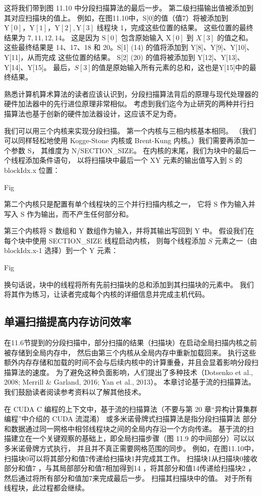 这将我们带到图 11.10 中分段扫描算法的最后一步。 第二级扫描输出值被添加到其对应扫描块的值上。 
例如，在图11.10中，S[0]的值（值7）将被添加到$\mathrm{Y}[0]，\mathrm{Y}[1]，\mathrm{Y}[2], \mathrm{Y}[3]$ 线程块 1，完成这些位置的结果。 这些位置的最终结果为 $7,11,12,14$。 
这是因为 $\mathrm{S}[0]$ 包含原始输入 $\mathrm{X}[0]$ 到 $X[3]$ 的值之和。 
这些最终结果是 14、17、18 和 20。S[1] (14) 的值将添加到 Y[8]、Y[9]、Y[10]、Y[11]，从而完成 这些位置的结果。 
S[2] (20) 的值将被添加到 Y[12]、Y[13]、Y[14]、Y[15]。 最后，$S[3]$的值是原始输入所有元素的总和，这也是Y[15]中的最终结果。

熟悉计算机算术算法的读者应该认识到，分段扫描算法背后的原理与现代处理器的硬件加法器中的先行进位原理非常相似。 
考虑到我们迄今为止研究的两种并行扫描算法也基于创新的硬件加法器设计，这应该不足为奇。

我们可以用三个内核来实现分段扫描。 第一个内核与三相内核基本相同。 
（我们可以同样轻松地使用 Kogge-Stone 内核或 Brent-Kung 内核。）我们需要再添加一个参数 S，
其维度为 N/SECTION\_SIZE。 
在内核的末尾，我们为块中的最后一个线程添加条件语句，
以将扫描块中最后一个 $\mathrm{XY}$ 元素的输出值写入到 S 的 blockIdx.x 位置：

{\color{red} Fig}

第二个内核只是配置有单个线程块的三个并行扫描内核之一，
它将 $\mathrm{S}$ 作为输入并写入 $\mathrm{S}$ 作为输出，而不产生任何部分和。

第三个内核将 $\mathrm{S}$ 数组和 $\mathrm{Y}$ 数组作为输入，并将其输出写回到 Y 中。
假设我们在每个块中使用 SECTION\_SIZE 线程启动内核，
则每个线程添加 $S$ 元素之一（由 blockIdx.x-1 选择）到一个 $\mathrm{Y}$ 元素：

{\color{red} Fig}

换句话说，块中的线程将所有先前扫描块的总和添加到其扫描块的元素中。 
我们将其作为练习，让读者完成每个内核的详细信息并完成主机代码。

\subsection{单遍扫描提高内存访问效率}
在11.6节提到的分段扫描中，部分扫描的结果（扫描块）在启动全局扫描内核之前被存储到全局内存中，
然后由第三个内核从全局内存中重新加载回来。 
执行这些额外内存存储和加载的时间不会与后续内核中的计算重叠，并且会显着影响分段扫描算法的速度。 
为了避免这种负面影响，人们提出了多种技术（Dotsenko et al., 2008; Merrill \& Garland, 2016; Yan et al., 2013）。 
本章讨论基于流的扫描算法。 我们鼓励读者阅读参考资料以了解其他技术。

在 CUDA C 编程的上下文中，基于流的扫描算法（不要与第 20 章“异构计算集群编程”中介绍的 CUDA 流混淆）
或多米诺骨牌式扫描算法是指分段扫描算法 部分和数据通过同一网格中相邻线程块之间的全局内存沿一个方向传递。 
基于流的扫描建立在一个关键观察的基础上，即全局扫描步骤（图 11.9 的中间部分）可以以多米诺骨牌方式执行，
并且并不真正需要网格范围的同步。 例如，在图11.10中，扫描块0可以将其部分和值7传递给扫描块1并完成其工作。 
扫描块1从扫描块0接收部分和值7 ，与其局部部分和值7相加得到14 ，将其部分和值14传递给扫描块2 ，
然后通过将所有部分和值加7来完成最后一步。 扫描其扫描块中的值。 对于所有线程块，此过程都会继续。

